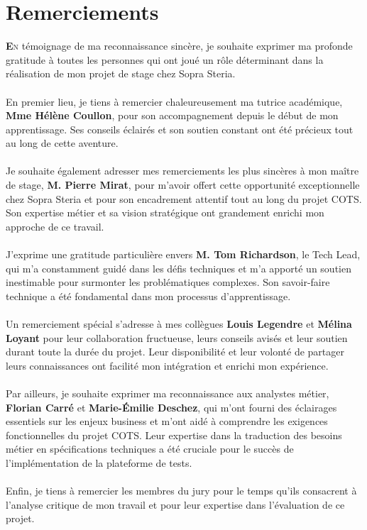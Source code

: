 \chapter*{Remerciements}
\lettrine{\textbf{E}}\lowercase{n} témoignage de ma reconnaissance sincère, je souhaite exprimer ma profonde gratitude à toutes les personnes qui ont joué un rôle déterminant dans la réalisation de mon projet de stage chez Sopra Steria. \\[0.3cm]
\\
En premier lieu, je tiens à remercier chaleureusement ma tutrice académique, \textbf{Mme Hélène Coullon}, pour son accompagnement depuis le début de mon apprentissage. Ses conseils éclairés et son soutien constant ont été précieux tout au long de cette aventure. \\[0.3cm]
\\
Je souhaite également adresser mes remerciements les plus sincères à mon maître de stage, \textbf{M. Pierre Mirat}, pour m'avoir offert cette opportunité exceptionnelle chez Sopra Steria et pour son encadrement attentif tout au long du projet COTS. Son expertise métier et sa vision stratégique ont grandement enrichi mon approche de ce travail. \\[0.3cm]
\\
J'exprime une gratitude particulière envers \textbf{M. Tom Richardson}, le Tech Lead, qui m'a constamment guidé dans les défis techniques et m'a apporté un soutien inestimable pour surmonter les problématiques complexes. Son savoir-faire technique a été fondamental dans mon processus d'apprentissage. \\[0.3cm]
\\
Un remerciement spécial s'adresse à mes collègues \textbf{Louis Legendre} et \textbf{Mélina Loyant} pour leur collaboration fructueuse, leurs conseils avisés et leur soutien durant toute la durée du projet. Leur disponibilité et leur volonté de partager leurs connaissances ont facilité mon intégration et enrichi mon expérience. \\[0.3cm]
\\
Par ailleurs, je souhaite exprimer ma reconnaissance aux analystes métier, \textbf{Florian Carré} et \textbf{Marie-Émilie Deschez}, qui m'ont fourni des éclairages essentiels sur les enjeux business et m'ont aidé à comprendre les exigences fonctionnelles du projet COTS. Leur expertise dans la traduction des besoins métier en spécifications techniques a été cruciale pour le succès de l'implémentation de la plateforme de tests. \\[0.3cm] 
\\
Enfin, je tiens à remercier les membres du jury pour le temps qu'ils consacrent à l'analyse critique de mon travail et pour leur expertise dans l'évaluation de ce projet.